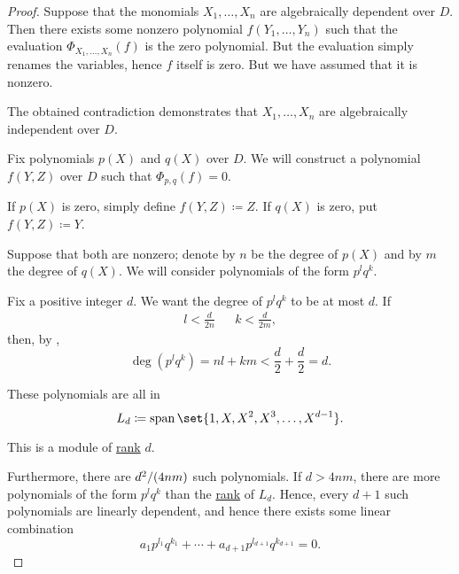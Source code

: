 \begin{proof}
   Suppose that the monomials \( X_1, \ldots, X_n \) are algebraically dependent over \( D \). Then there exists some nonzero polynomial \( f(Y_1, \ldots, Y_n) \) such that the evaluation \( \Phi_{X_1, \dots, X_n}(f) \) is the zero polynomial. But the evaluation simply renames the variables, hence \( f \) itself is zero. But we have assumed that it is nonzero.

  The obtained contradiction demonstrates that \( X_1, \ldots, X_n \) are algebraically independent over \( D \).

   Fix polynomials \( p(X) \) and \( q(X) \) over \( D \). We will construct a polynomial \( f(Y, Z) \) over \( D \) such that \( \Phi_{p,q}(f) = 0 \).

  If \( p(X) \) is zero, simply define \( f(Y, Z) \coloneqq Z \). If \( q(X) \) is zero, put \( f(Y, Z) \coloneqq Y \).

  Suppose that both are nonzero; denote by \( n \) be the degree of \( p(X) \) and by \( m \) the degree of \( q(X) \). We will consider polynomials of the form \( p^l q^k \).

  Fix a positive integer \( d \). We want the degree of \( p^l q^k \) to be at most \( d \). If
  \begin{align*}
    l < \frac d {2n} && k < \frac d {2m},
  \end{align*}
  then, by ,
  \begin{equation*}
    \deg(p^l q^k) = nl + km < \frac d 2 + \frac d 2 = d.
  \end{equation*}

  These polynomials are all in
  \begin{equation*}
    L_d \coloneqq \linspan\set{ 1, X, X^2, X^3, \ldots, X^{d-1} }.
  \end{equation*}

  This is a module of \hyperref[thm:commutative_module_rank]{rank} \( d \).

  Furthermore, there are \( d^2 / (4nm) \) such polynomials. If \( d > 4nm \), there are more polynomials of the form \( p^l q^k \) than the \hyperref[thm:commutative_module_rank]{rank} of \( L_d \). Hence, every \( d + 1 \) such polynomials are linearly dependent, and hence there exists some linear combination
  \begin{equation*}
    a_1 p^{l_1} q^{k_1} + \cdots + a_{d+1} p^{l_{d+1}} q^{k_{d+1}} = 0.
  \end{equation*}


\end{proof}
